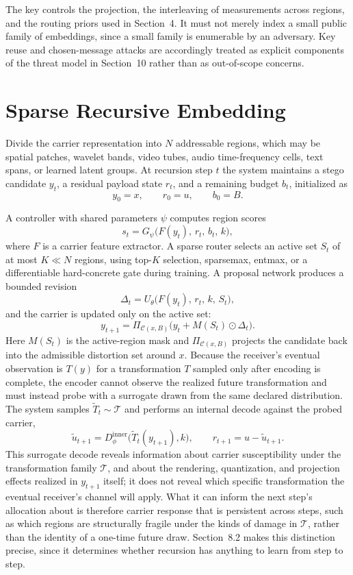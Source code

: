 \documentclass[11pt]{article}
\begin{document}
The key controls the projection, the interleaving of measurements across regions, and the routing priors used in Section~4. It must not merely index a small public family of embeddings, since a small family is enumerable by an adversary. Key reuse and chosen-message attacks are accordingly treated as explicit components of the threat model in Section~10 rather than as out-of-scope concerns.

\section{Sparse Recursive Embedding}

Divide the carrier representation into $N$ addressable regions, which may be spatial patches, wavelet bands, video tubes, audio time-frequency cells, text spans, or learned latent groups. At recursion step $t$ the system maintains a stego candidate $y_t$, a residual payload state $r_t$, and a remaining budget $b_t$, initialized as
\[
y_0 = x, \qquad r_0 = u, \qquad b_0 = B.
\]

A controller with shared parameters $\psi$ computes region scores
\[
s_t = G_\psi\bigl(F(y_t),\, r_t,\, b_t,\, k\bigr),
\]
where $F$ is a carrier feature extractor. A sparse router selects an active set $S_t$ of at most $K \ll N$ regions, using top-$K$ selection, sparsemax, entmax, or a differentiable hard-concrete gate during training. A proposal network produces a bounded revision
\[
\Delta_t = U_\theta\bigl(F(y_t),\, r_t,\, k,\, S_t\bigr),
\]
and the carrier is updated only on the active set:
\[
y_{t+1} = \Pi_{\mathcal{C}(x,B)}\bigl(y_t + M(S_t) \odot \Delta_t\bigr).
\]
Here $M(S_t)$ is the active-region mask and $\Pi_{\mathcal{C}(x,B)}$ projects the candidate back into the admissible distortion set around $x$. Because the receiver's eventual observation is $T(y)$ for a transformation $T$ sampled only after encoding is complete, the encoder cannot observe the realized future transformation and must instead probe with a surrogate drawn from the same declared distribution. The system samples $\widetilde T_t \sim \mathcal{T}$ and performs an internal decode against the probed carrier,
\[
\tilde u_{t+1} = D_\phi^{\mathrm{inner}}\bigl(\widetilde T_t(y_{t+1}), k\bigr), \qquad r_{t+1} = u - \tilde u_{t+1}.
\]
This surrogate decode reveals information about carrier susceptibility under the transformation family $\mathcal{T}$, and about the rendering, quantization, and projection effects realized in $y_{t+1}$ itself; it does not reveal which specific transformation the eventual receiver's channel will apply. What it can inform the next step's allocation about is therefore carrier response that is persistent across steps, such as which regions are structurally fragile under the kinds of damage in $\mathcal{T}$, rather than the identity of a one-time future draw. Section~8.2 makes this distinction precise, since it determines whether recursion has anything to learn from step to step.
\end{document}
